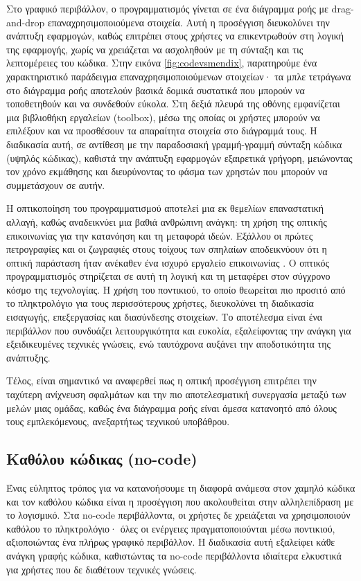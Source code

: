                 Στο γραφικό περιβάλλον, ο προγραμματισμός γίνεται σε ένα διάγραμμα ροής με drag-and-drop επαναχρησιμοποιούμενα στοιχεία. Αυτή η προσέγγιση διευκολύνει την ανάπτυξη εφαρμογών, καθώς επιτρέπει στους χρήστες να επικεντρωθούν στη λογική της εφαρμογής, χωρίς να χρειάζεται να ασχοληθούν με τη σύνταξη και τις λεπτομέρειες του κώδικα. Στην εικόνα \ref{fig:codevsmendix}, παρατηρούμε ένα χαρακτηριστικό παράδειγμα επαναχρησιμοποιούμενων στοιχείων· τα μπλε τετράγωνα στο διάγραμμα ροής αποτελούν βασικά δομικά συστατικά που μπορούν να τοποθετηθούν και να συνδεθούν εύκολα. Στη δεξιά πλευρά της οθόνης εμφανίζεται μια βιβλιοθήκη εργαλείων (toolbox), μέσω της οποίας οι χρήστες μπορούν να επιλέξουν και να προσθέσουν τα απαραίτητα στοιχεία στο διάγραμμά τους. Η διαδικασία αυτή, σε αντίθεση με την παραδοσιακή γραμμή-γραμμή σύνταξη κώδικα (υψηλός κώδικας), καθιστά την ανάπτυξη εφαρμογών εξαιρετικά γρήγορη, μειώνοντας τον χρόνο εκμάθησης και διευρύνοντας το φάσμα των χρηστών που μπορούν να συμμετάσχουν σε αυτήν.

                Η οπτικοποίηση του προγραμματισμού αποτελεί μια εκ θεμελίων επαναστατική αλλαγή, καθώς αναδεικνύει μια βαθιά ανθρώπινη ανάγκη: τη χρήση της οπτικής επικοινωνίας για την κατανόηση και τη μεταφορά ιδεών. Εξάλλου οι πρώτες πετρογραφίες και οι ζωγραφιές στους τοίχους των σπηλαίων αποδεικνύουν ότι η οπτική παράσταση ήταν ανέκαθεν ένα ισχυρό εργαλείο επικοινωνίας \cite{CASEKuhn}. Ο οπτικός προγραμματισμός στηρίζεται σε αυτή τη λογική και τη μεταφέρει στον σύγχρονο κόσμο της τεχνολογίας. Η χρήση του ποντικιού, το οποίο θεωρείται πιο προσιτό από το πληκτρολόγιο για τους περισσότερους χρήστες, διευκολύνει τη διαδικασία εισαγωγής, επεξεργασίας και διασύνδεσης στοιχείων. Το αποτέλεσμα είναι ένα περιβάλλον που συνδυάζει λειτουργικότητα και ευκολία, εξαλείφοντας την ανάγκη για εξειδικευμένες τεχνικές γνώσεις, ενώ ταυτόχρονα αυξάνει την αποδοτικότητα της ανάπτυξης.

                Τέλος, είναι σημαντικό να αναφερθεί πως η οπτική προσέγγιση επιτρέπει την ταχύτερη ανίχνευση σφαλμάτων και την πιο αποτελεσματική συνεργασία μεταξύ των μελών μιας ομάδας, καθώς ένα διάγραμμα ροής είναι άμεσα κατανοητό από όλους τους εμπλεκόμενους, ανεξαρτήτως τεχνικού υποβάθρου.

            \subsection{Καθόλου κώδικας (no-code)}
                Ένας εύληπτος τρόπος για να κατανοήσουμε τη διαφορά ανάμεσα στον χαμηλό κώδικα και τον καθόλου κώδικα είναι η προσέγγιση που ακολουθείται στην αλληλεπίδραση με το λογισμικό. Στα no-code περιβάλλοντα, οι χρήστες δε χρειάζεται να χρησιμοποιούν καθόλου το πληκτρολόγιο· όλες οι ενέργειες πραγματοποιούνται μέσω ποντικιού, αξιοποιώντας ένα πλήρως γραφικό περιβάλλον. Η διαδικασία αυτή εξαλείφει κάθε ανάγκη γραφής κώδικα, καθιστώντας τα no-code περιβάλλοντα ιδιαίτερα ελκυστικά για χρήστες που δε διαθέτουν τεχνικές γνώσεις.

